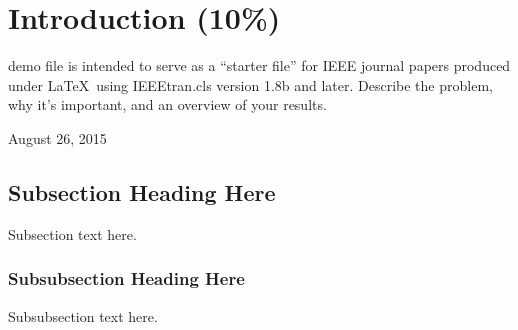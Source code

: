 \documentclass[journal]{IEEEtran}
\begin{document}
\section{Introduction (10\%)}
% 
% 
% 
% 
 demo file is intended to serve as a ``starter file''
for IEEE journal papers produced under \LaTeX\ using
IEEEtran.cls version 1.8b and later.
Describe the problem, why it’s important, and an overview of your results.

 
\hfill August 26, 2015

\subsection{Subsection Heading Here}
Subsection text here.


\subsubsection{Subsubsection Heading Here}
Subsubsection text here.


%
%
\end{document}
